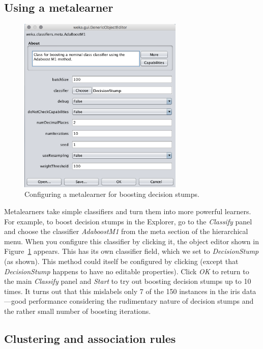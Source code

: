 \subsection{Using a metalearner}

\begin{figure}[!ht]
\centering
\includegraphics[width=0.7\textwidth]{images/B2_14.png}
\caption{Configuring a metalearner for boosting decision stumps.}
\label{fig:config_metalearner}
\end{figure}


Metalearners take simple classifiers and turn them into more powerful
learners. For example, to boost decision stumps in the Explorer, go to
the \textit{Classify} panel and choose the classifier
\textit{AdaboostM1} from the meta section of the hierarchical
menu. When you configure this classifier by clicking it, the object
editor shown in Figure~\ref{fig:config_metalearner} appears. This has
its own classifier field, which we set to \textit{DecisionStump} (as
shown). This method could itself be configured by clicking (except
that \textit{DecisionStump} happens to have no editable
properties). Click \textit{OK} to return to the main \textit{Classify}
panel and {\em Start} to try out boosting decision stumps up to 10 times. It
turns out that this mislabels only 7 of the 150 instances in the iris
data---good performance considering the rudimentary nature of decision
stumps and the rather small number of boosting iterations.

\subsection{Clustering and association rules}

